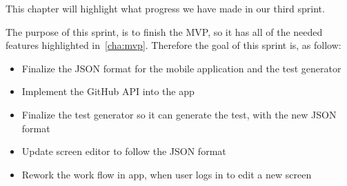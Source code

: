 This chapter will highlight what progress we have made in our third sprint.

The purpose of this sprint, is to finish the MVP, so it has all of the needed features highlighted in~\autoref{cha:mvp}.
Therefore the goal of this sprint is, as follow:

\begin{itemize}
    \item Finalize the JSON format for the mobile application and the test generator
    \item Implement the GitHub API into the app
    \item Finalize the test generator so it can generate the test, with the new JSON format
    \item Update screen editor to follow the JSON format
    \item Rework the work flow in app, when user logs in to edit a new screen
\end{itemize}

